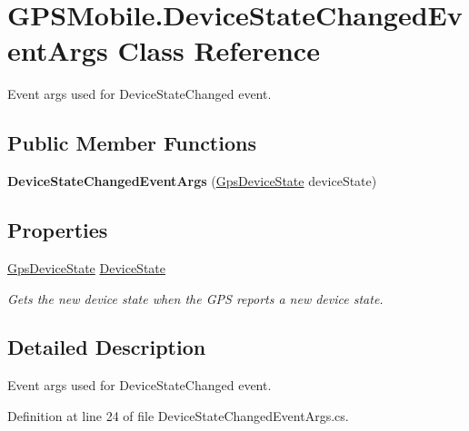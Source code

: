 \hypertarget{class_g_p_s_mobile_1_1_device_state_changed_event_args}{
\section{GPSMobile.DeviceStateChangedEventArgs Class Reference}
\label{class_g_p_s_mobile_1_1_device_state_changed_event_args}
}


Event args used for DeviceStateChanged event.  
\subsection*{Public Member Functions}
\begin{DoxyCompactItemize}
\item 
\hypertarget{class_g_p_s_mobile_1_1_device_state_changed_event_args_a4e2716f3879213e538b76481ab20ec2e}{
{\bfseries DeviceStateChangedEventArgs} (\hyperlink{class_g_p_s_mobile_1_1_gps_device_state}{GpsDeviceState} deviceState)}
\label{class_g_p_s_mobile_1_1_device_state_changed_event_args_a4e2716f3879213e538b76481ab20ec2e}

\end{DoxyCompactItemize}
\subsection*{Properties}
\begin{DoxyCompactItemize}
\item 
\hyperlink{class_g_p_s_mobile_1_1_gps_device_state}{GpsDeviceState} \hyperlink{class_g_p_s_mobile_1_1_device_state_changed_event_args_a968ff2111d16cb1036db641703948cb5}{DeviceState}
\begin{DoxyCompactList}\small\item\em Gets the new device state when the GPS reports a new device state. \item\end{DoxyCompactList}\end{DoxyCompactItemize}


\subsection{Detailed Description}
Event args used for DeviceStateChanged event. 

Definition at line 24 of file DeviceStateChangedEventArgs.cs.

